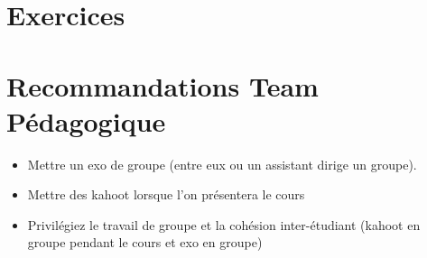 \documentclass{article}
\begin{document}
\section{Exercices}


\section{Recommandations Team Pédagogique}

\begin{itemize}
    \item Mettre un exo de groupe (entre eux ou un assistant dirige un groupe). 
    \item Mettre des kahoot lorsque l'on présentera le cours
    \item Privilégiez le travail de groupe et la cohésion inter-étudiant (kahoot en groupe pendant le cours et exo en groupe)
\end{itemize}
\end{document}
